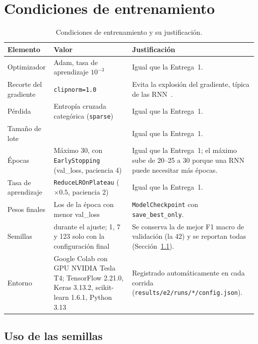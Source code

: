 \documentclass[12pt, a4paper]{article}
\begin{document}
\section{Condiciones de entrenamiento}\label{sec:entrenamiento}

\begin{table}[H]
\centering
\caption{Condiciones de entrenamiento y su justificación.}
\label{tab:condiciones}
\small
\begin{tabularx}{\linewidth}{>{\raggedright\arraybackslash}p{3.3cm} >{\raggedright\arraybackslash}p{4.8cm} X}
\toprule
\textbf{Elemento} & \textbf{Valor} & \textbf{Justificación} \\
\midrule
Optimizador & Adam, tasa de aprendizaje $10^{-3}$ & Igual que la Entrega~1. \\
Recorte del gradiente & \texttt{clipnorm=1.0} & Evita la explosión del gradiente, típica de las RNN~\cite{pascanu2013}. \\
Pérdida & Entropía cruzada categórica (\texttt{sparse}) & Igual que la Entrega~1. \\
Tamaño de lote & 64 & Igual que la Entrega~1. \\
Épocas & Máximo 30, con \texttt{EarlyStopping} (val\_loss, paciencia 4) & Igual que la Entrega~1; el máximo sube de 20--25 a 30 porque una RNN puede necesitar más épocas. \\
Tasa de aprendizaje & \texttt{ReduceLROnPlateau} ($\times 0.5$, paciencia 2) & Igual que la Entrega~1. \\
Pesos finales & Los de la época con menor val\_loss & \texttt{ModelCheckpoint} con \texttt{save\_best\_only}. \\
Semillas & 42 durante el ajuste; 1, 7 y 123 solo con la configuración final & Se conserva la de mejor F1 macro de validación (la 42) y se reportan todas (Sección~\ref{sec:semillas}). \\
Entorno & Google Colab con GPU NVIDIA Tesla T4; TensorFlow 2.21.0, Keras 3.13.2, scikit-learn 1.6.1, Python 3.13 & Registrado automáticamente en cada corrida (\texttt{results/e2/runs/*/config.json}). \\
\bottomrule
\end{tabularx}
\end{table}

\subsection{Uso de las semillas}\label{sec:semillas}
\end{document}
